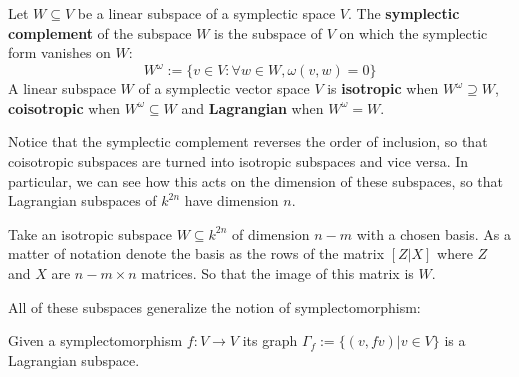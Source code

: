 \begin{definition}
Let $W \subseteq V$ be a linear subspace of a symplectic space $V$.
The {\bf symplectic complement} of the subspace $W$ is the subspace of $V$ on which the symplectic form vanishes on $W$:
$$
W^\omega:= \{v \in V : \forall w \in W, \omega(v,w)=0 \}
$$
A linear subspace  $W$ of a symplectic vector space $V$ is {\bf isotropic} when $W^\omega \supseteq W$, {\bf coisotropic} when $W^\omega \subseteq W$ and {\bf Lagrangian} when $W^\omega=W$.
\end{definition}
Notice that the symplectic complement reverses the order of inclusion, so that coisotropic subspaces are turned into isotropic subspaces and vice versa.  In particular, we can see how this acts on the dimension of these subspaces, so that Lagrangian subspaces of $k^{2n}$ have dimension $n$.


Take an isotropic subspace $W \subseteq k^{2n}$ of dimension $n-m$ with a chosen basis.  As a matter of notation denote the basis as the rows of the matrix $[Z|X]$ where $Z$ and $X$ are  $n-m\times n$ matrices. So that the image of this matrix is $W$.


All of these subspaces generalize the notion of symplectomorphism:
\begin{lemma}
Given a symplectomorphism $f:V\to V$ its graph  $\Gamma_f:=\{ (v, fv) | v \in V \}$ is a Lagrangian subspace.
\end{lemma}


